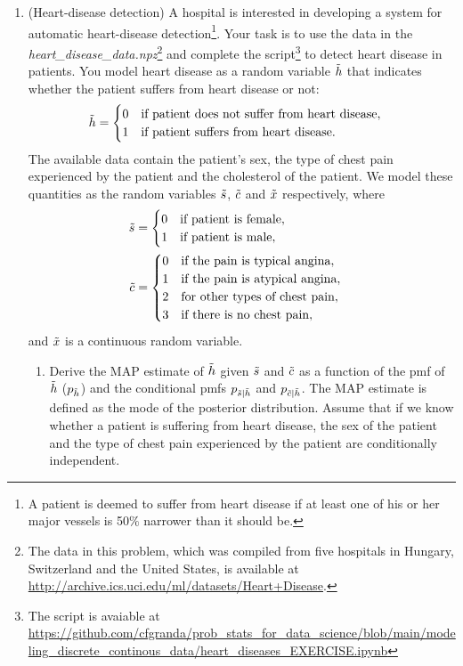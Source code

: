 \documentclass[12pt,twoside]{article}
\newcommand{\rnd}{\Tilde}
\begin{document}
\begin{enumerate}
\item (Heart-disease detection)
A hospital is interested in developing a system for automatic heart-disease detection\footnote{A patient is deemed to suffer from heart disease if at least one of his or her major vessels is 50$\%$ narrower than it should be.}. Your task is to use the data in the \emph{heart\_disease\_data.npz}\footnote{The data in this problem, which was compiled from five hospitals in Hungary, Switzerland and the United States, is available at \url{http://archive.ics.uci.edu/ml/datasets/Heart+Disease}.  }  and complete the script\footnote{The script is avaiable at \url{https://github.com/cfgranda/prob_stats_for_data_science/blob/main/modeling_discrete_continous_data/heart_diseases_EXERCISE.ipynb} } to detect heart disease in patients. You model heart disease as a random variable $\rnd{h}$ that indicates whether the patient suffers from heart disease or not:
\begin{align*}
\rnd{h} = \begin{cases}
0 \quad \text{if patient does not suffer from heart disease},\\
1 \quad \text{if patient suffers from heart disease}.
\end{cases} 
\end{align*}
The available data contain the patient's sex, the type of chest pain experienced by the patient and the cholesterol of the patient. We model these quantities as the random variables $\rnd{s}$, $\rnd{c}$ and $\rnd{x}$ respectively, where
\begin{align*}
\rnd{s} & = \begin{cases}
0 \quad \text{if patient is female},\\
1 \quad \text{if patient is male},
\end{cases}\\
\rnd{c} &= \begin{cases}
0 \quad \text{if the pain is typical angina},\\
1 \quad \text{if the pain is atypical angina},\\
2 \quad \text{for other types of chest pain},\\
3 \quad \text{if there is no chest pain},
\end{cases}
\end{align*}
and $\rnd{x}$ is a continuous random variable.
\begin{enumerate}
\item Derive the MAP estimate of $\rnd{h}$ given $\rnd{s}$ and $\rnd{c}$ as a function of the pmf of $\rnd{h}$ ($ p_{\rnd{h}}$) and the conditional pmfs $p_{\rnd{s}|\rnd{h}}$ and $ p_{\rnd{c}|\rnd{h}}$. The MAP estimate is defined as the mode of the posterior distribution. Assume that if we know whether a patient is suffering from heart disease, the sex of the patient and the type of chest pain experienced by the patient are conditionally independent. 

\end{enumerate}
\end{enumerate}
\end{document}
